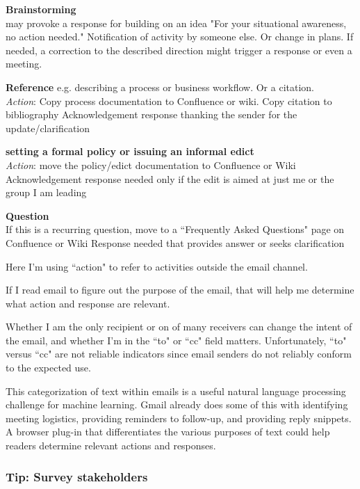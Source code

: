 \textbf{Brainstorming}\\
may provoke a response for building on an idea
"For your situational awareness, no action needed." Notification of activity by someone else. Or change in plans. 
If needed, a correction to the described direction might trigger a response or even a meeting.

\textbf{Reference} e.g. describing a process or business workflow. Or a citation.\\
\textit{Action}: Copy process documentation to Confluence or wiki. Copy citation to bibliography
Acknowledgement response thanking the sender for the update/clarification

\textbf{setting a formal policy or issuing an informal edict}\\
\textit{Action}: move the policy/edict documentation to Confluence or Wiki
Acknowledgement response needed only if the edit is aimed at just me or the group I am leading

\textbf{Question}\\
If this is a recurring question, move to a ``Frequently Asked Questions" page on Confluence or Wiki
Response needed that provides answer or seeks clarification


Here I'm using ``action" to refer to activities outside the email channel. 

If I read email to figure out the purpose of the email, that will help me determine what action and response are relevant. 

Whether I am the only recipient or on of many receivers can change the intent of the email, and whether I'm in the ``to" or ``cc" field matters. Unfortunately, ``to" versus ``cc" are not reliable indicators since email senders do not reliably conform to the expected use. 



This categorization of text within emails is a useful natural language processing challenge for machine learning. Gmail already does some of this with identifying meeting logistics, providing reminders to follow-up, and providing reply snippets. A browser plug-in that differentiates the various purposes of text could help readers determine relevant actions and responses. 



\subsubsection{Tip: Survey stakeholders}

